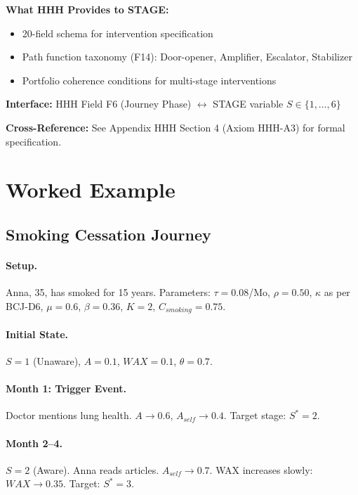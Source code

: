 \begin{tcolorbox}[colback=orange!5!white, colframe=orange!75!black,
    title=\textbf{Integration: STAGE $\leftrightarrow$ HHH (Intervention Toolkit)}]
\textbf{What HHH Provides to STAGE:}
\begin{itemize}[nosep]
\item 20-field schema for intervention specification
\item Path function taxonomy (F14): Door-opener, Amplifier, Escalator, Stabilizer
\item Portfolio coherence conditions for multi-stage interventions
\end{itemize}

\textbf{Interface:} HHH Field F6 (Journey Phase) $\leftrightarrow$ STAGE variable $S \in \{1, \ldots, 6\}$

\textbf{Cross-Reference:} See Appendix HHH Section 4 (Axiom HHH-A3) for formal specification.

\end{tcolorbox}



\section{Worked Example}
\label{sec:bcj-example}

\subsection{Smoking Cessation Journey}

\paragraph{Setup.} Anna, 35, has smoked for 15 years. Parameters: $\tau=0.08$/Mo, $\rho=0.50$, $\kappa$ as per BCJ-D6, $\mu=0.6$, $\beta=0.36$, $K=2$, $C_{smoking}=0.75$.

\paragraph{Initial State.} $S=1$ (Unaware), $A=0.1$, $WAX=0.1$, $\theta=0.7$.

\paragraph{Month 1: Trigger Event.} Doctor mentions lung health. $A \to 0.6$, $A_{self} \to 0.4$. Target stage: $S^*=2$.

\paragraph{Month 2--4.} $S=2$ (Aware). Anna reads articles. $A_{self} \to 0.7$. WAX increases slowly: $WAX \to 0.35$. Target: $S^*=3$.

